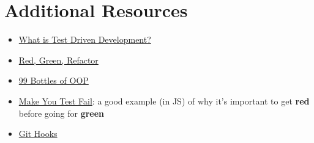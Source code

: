 
\section{Additional Resources}

\begin{itemize}[leftmargin=*]
    \item \href{https://www.freecodecamp.org/news/test-driven-development-what-it-is-and-what-it-is-not-41fa6bca02a2/}{What is Test Driven Development?}
    \item \href{https://www.codecademy.com/articles/tdd-red-green-refactor}{Red, Green, Refactor}
    \item \href{https://www.sandimetz.com/99bottles}{99 Bottles of OOP}
    \item \href{https://kentcdodds.com/blog/make-your-test-fail}{Make You Test Fail}: a good example (in JS) of why it's important to get \textbf{red} before going for \textbf{green}
    \item \href{https://git-scm.com/book/en/v2/Customizing-Git-Git-Hooks}{Git Hooks}
\end{itemize}
